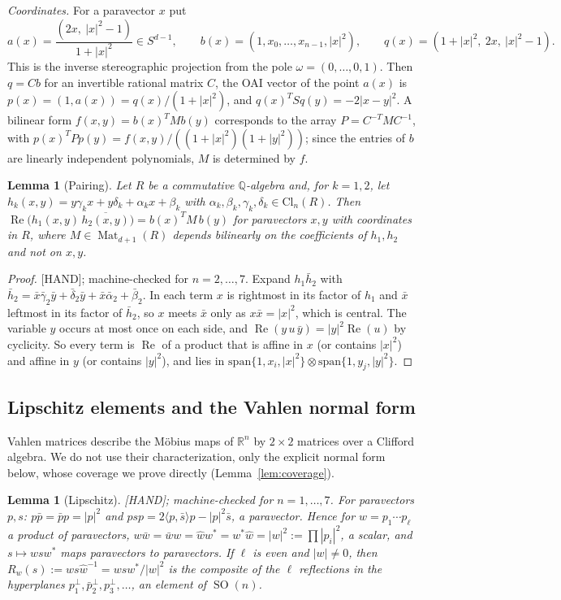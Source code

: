 \documentclass[11pt]{amsart}
\newcommand{\st}[1]{\textsf{[#1]}}
\newcommand{\Q}{\mathbb{Q}}
\newcommand{\R}{\mathbb{R}}
\newcommand{\Cl}{\mathrm{Cl}}
\newcommand{\Rea}{\operatorname{Re}}
\DeclareMathOperator{\SO}{SO}
\DeclareMathOperator{\Mat}{Mat}
\theoremstyle{plain}
\newtheorem{lemma}[theorem]{Lemma}
\theoremstyle{definition}
\begin{document}
\noindent\emph{Coordinates.} For a paravector $x$ put
\[
 a(x)=\frac{(2x,\ |x|^2-1)}{1+|x|^2}\in S^{d-1},\qquad
 b(x)=(1,x_0,\dots,x_{n-1},|x|^2),\qquad q(x)=(1+|x|^2,\ 2x,\ |x|^2-1).
\]
This is the inverse stereographic projection from the pole $\omega=(0,\dots,0,1)$. Then $q=Cb$ for an
invertible rational matrix $C$, the OAI vector of the point $a(x)$ is $p(x)=(1,a(x))=q(x)/(1+|x|^2)$,
and $q(x)^TSq(y)=-2|x-y|^2$. A bilinear form $f(x,y)=b(x)^TMb(y)$ corresponds to the array
$P=C^{-T}MC^{-1}$, with $p(x)^TPp(y)=f(x,y)/((1+|x|^2)(1+|y|^2))$; since the entries of $b$ are
linearly independent polynomials, $M$ is determined by $f$.

\begin{lemma}[Pairing]\label{lem:pairing}
Let $R$ be a commutative $\Q$-algebra and, for $k=1,2$, let
$h_k(x,y)=y\gamma_kx+y\delta_k+\alpha_kx+\beta_k$ with $\alpha_k,\beta_k,\gamma_k,\delta_k\in\Cl_n(R)$.
Then $\Rea\bigl(h_1(x,y)\,\overline{h_2(x,y)}\bigr)=b(x)^TM\,b(y)$ for paravectors $x,y$ with
coordinates in $R$, where $M\in\Mat_{d+1}(R)$ depends bilinearly on the coefficients of $h_1,h_2$ and
not on $x,y$.
\end{lemma}

\begin{proof}
\st{HAND}; machine-checked for $n=2,\dots,7$. Expand
$h_1\bar h_2$ with $\bar h_2=\bar x\bar\gamma_2\bar y+\bar\delta_2\bar y+\bar x\bar\alpha_2+\bar\beta_2$.
In each term $x$ is rightmost in its factor of $h_1$ and $\bar x$ leftmost in its factor of $\bar
h_2$, so $x$ meets $\bar x$ only as $x\bar x=|x|^2$, which is central. The variable $y$ occurs at most
once on each side, and $\Rea(y\,u\,\bar y)=|y|^2\Rea(u)$ by cyclicity. So every term is $\Rea$ of a
product that is affine in $x$ (or contains $|x|^2$) and affine in $y$ (or contains $|y|^2$), and
lies in $\mathrm{span}\{1,x_i,|x|^2\}\otimes\mathrm{span}\{1,y_j,|y|^2\}$.
\end{proof}

\subsection{Lipschitz elements and the Vahlen normal form}

Vahlen matrices \cite{Vahlen,Ahlfors85,EGM,Waterman} describe the M\"obius maps of $\R^n$ by $2\times2$ matrices over a
Clifford algebra. We do not use their characterization, only the explicit normal form below, whose
coverage we prove directly (Lemma~\ref{lem:coverage}).

\begin{lemma}[Lipschitz]\label{lem:lipschitz}
\st{HAND}; machine-checked for $n=1,\dots,7$. For paravectors $p,s$: $p\bar p=\bar pp=|p|^2$ and
$psp=2\langle p,\bar s\rangle p-|p|^2\bar s$, a paravector. Hence for $w=p_1\cdots p_\ell$ a product of
paravectors, $w\bar w=\bar ww=\hat ww^*=w^*\hat w=|w|^2:=\prod|p_i|^2$, a scalar, and $s\mapsto
wsw^*$ maps paravectors to paravectors. If $\ell$ is even and $|w|\neq0$, then
$R_w(s):=ws\hat w^{-1}=wsw^*/|w|^2$ is the composite of the $\ell$ reflections in the hyperplanes
$p_1^\perp,\bar p_2^\perp,p_3^\perp,\dots$, an element of $\SO(n)$.
\end{lemma}
\end{document}

